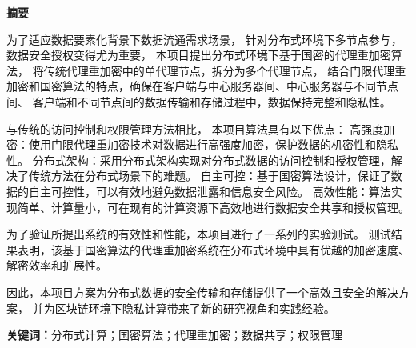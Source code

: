 \begin{center}\heiti\sanhao\textbf{
		摘要
	}
\end{center}

为了适应数据要素化背景下数据流通需求场景，
针对分布式环境下多节点参与，数据安全授权变得尤为重要，
本项目提出分布式环境下基于国密的代理重加密算法，
将传统代理重加密中的单代理节点，拆分为多个代理节点，
结合门限代理重加密和国密算法的特点，确保在客户端与中心服务器间、中心服务器与不同节点间、
客户端和不同节点间的数据传输和存储过程中，数据保持完整和隐私性。

与传统的访问控制和权限管理方法相比，
本项目算法具有以下优点：
高强度加密：使用门限代理重加密技术对数据进行高强度加密，保护数据的机密性和隐私性。
分布式架构：采用分布式架构实现对分布式数据的访问控制和授权管理，解决了传统方法在分布式场景下的难题。
自主可控：基于国密算法设计，保证了数据的自主可控性，可以有效地避免数据泄露和信息安全风险。
高效性能：算法实现简单、计算量小，可在现有的计算资源下高效地进行数据安全共享和授权管理。

为了验证所提出系统的有效性和性能，本项目进行了一系列的实验测试。
测试结果表明，该基于国密算法的代理重加密系统在分布式环境中具有优越的加密速度、解密效率和扩展性。

因此，本项目方案为分布式数据的安全传输和存储提供了一个高效且安全的解决方案，
并为区块链环境下隐私计算带来了新的研究视角和实践经验。

\textbf{关键词：}分布式计算；国密算法；代理重加密；数据共享；权限管理
\clearpage

